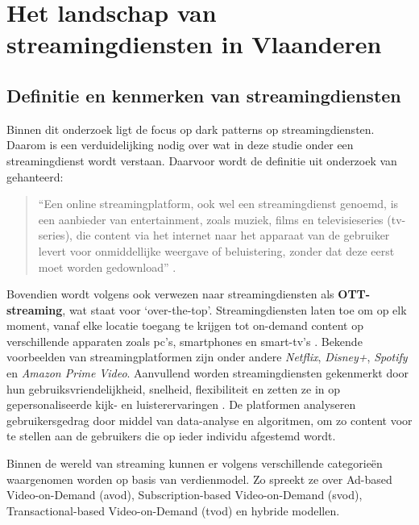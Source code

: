 \newpage

\section{Het landschap van streamingdiensten in Vlaanderen}
\label{sec:streaming-landschap}

\subsection{Definitie en kenmerken van streamingdiensten}
\label{subsec:definities-streaming}

\vspace{1em}

Binnen dit onderzoek ligt de focus op dark patterns op streamingdiensten. Daarom is een verduidelijking nodig over wat in deze studie onder een streamingdienst wordt verstaan. Daarvoor wordt de definitie uit onderzoek van \textcite{MuhdShukri2024} gehanteerd:
\begin{quote}
    “Een online streamingplatform, ook wel een streamingdienst genoemd, is een aanbieder van entertainment, zoals muziek, films en televisieseries (tv-series), die content via het internet naar het apparaat van de gebruiker levert voor onmiddellijke weergave of beluistering, zonder dat deze eerst moet worden gedownload” \autocite{MuhdShukri2024}.
\end{quote}
Bovendien wordt volgens \textcite{Kumar2025} ook verwezen naar streamingdiensten als \textbf{OTT-streaming}, wat staat voor ‘over-the-top’. Streamingdiensten laten toe om op elk moment, vanaf elke locatie toegang te krijgen tot on-demand content op verschillende apparaten zoals pc’s, smartphones en smart-tv’s \autocite{Kumar2025}. Bekende voorbeelden van streamingplatformen zijn onder andere \textit{Netflix}, \textit{Disney+}, \textit{Spotify} en \textit{Amazon Prime Video}. Aanvullend worden streamingdiensten gekenmerkt door hun gebruiksvriendelijkheid, snelheid, flexibiliteit en zetten ze in op gepersonaliseerde kijk- en luisterervaringen \autocite{Kumar2025}. De platformen analyseren gebruikersgedrag door middel van data-analyse en algoritmen, om zo content voor te stellen aan de gebruikers die op ieder individu afgestemd wordt. 

\vspace{1em}

Binnen de wereld van streaming kunnen er volgens \textcite{Mulla2022} verschillende categorieën waargenomen worden op basis van verdienmodel. Zo spreekt ze over Ad-based Video-on-Demand (\acrshort{avod}), Subscription-based Video-on-Demand (\acrshort{svod}), \newline Transactional-based Video-on-Demand (\acrshort{tvod}) en hybride modellen. 

